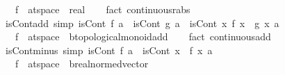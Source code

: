 \begin{isabellebody}
\ \ \ f\ {\isacharcolon}{\kern0pt}{\isacharcolon}{\kern0pt}\ {\isachardoublequoteopen}{\isacharprime}{\kern0pt}a{\isacharcolon}{\kern0pt}{\isacharcolon}{\kern0pt}t{}{\isacharunderscore}{\kern0pt}space\ {\isasymRightarrow}\ real{\isachardoublequoteclose}\isanewline
%
\isadelimproof
\ \ %
\endisadelimproof
%
\isatagproof
{}\isamarkupfalse%
\ {\isacharparenleft}{\kern0pt}fact\ continuous{\isacharunderscore}{\kern0pt}rabs{\isacharparenright}{\kern0pt}%
\endisatagproof
{\isafoldproof}%
%
\isadelimproof
\isanewline
%
\endisadelimproof
\isanewline
{}\isamarkupfalse%
\ isCont{\isacharunderscore}{\kern0pt}add\ {\isacharbrackleft}{\kern0pt}simp{\isacharbrackright}{\kern0pt}{\isacharcolon}{\kern0pt}\ {\isachardoublequoteopen}isCont\ f\ a\ {\isasymLongrightarrow}\ isCont\ g\ a\ {\isasymLongrightarrow}\ isCont\ {\isacharparenleft}{\kern0pt}{\isasymlambda}x{\isachardot}{\kern0pt}\ f\ x\ {\isacharplus}{\kern0pt}\ g\ x{\isacharparenright}{\kern0pt}\ a{\isachardoublequoteclose}\isanewline
\ \ \ f\ {\isacharcolon}{\kern0pt}{\isacharcolon}{\kern0pt}\ {\isachardoublequoteopen}{\isacharprime}{\kern0pt}a{\isacharcolon}{\kern0pt}{\isacharcolon}{\kern0pt}t{}{\isacharunderscore}{\kern0pt}space\ {\isasymRightarrow}\ {\isacharprime}{\kern0pt}b{\isacharcolon}{\kern0pt}{\isacharcolon}{\kern0pt}topological{\isacharunderscore}{\kern0pt}monoid{\isacharunderscore}{\kern0pt}add{\isachardoublequoteclose}\isanewline
%
\isadelimproof
\ \ %
\endisadelimproof
%
\isatagproof
{}\isamarkupfalse%
\ {\isacharparenleft}{\kern0pt}fact\ continuous{\isacharunderscore}{\kern0pt}add{\isacharparenright}{\kern0pt}%
\endisatagproof
{\isafoldproof}%
%
\isadelimproof
\isanewline
%
\endisadelimproof
\isanewline
{}\isamarkupfalse%
\ isCont{\isacharunderscore}{\kern0pt}minus\ {\isacharbrackleft}{\kern0pt}simp{\isacharbrackright}{\kern0pt}{\isacharcolon}{\kern0pt}\ {\isachardoublequoteopen}isCont\ f\ a\ {\isasymLongrightarrow}\ isCont\ {\isacharparenleft}{\kern0pt}{\isasymlambda}x{\isachardot}{\kern0pt}\ {\isacharminus}{\kern0pt}\ f\ x{\isacharparenright}{\kern0pt}\ a{\isachardoublequoteclose}\isanewline
\ \ \ f\ {\isacharcolon}{\kern0pt}{\isacharcolon}{\kern0pt}\ {\isachardoublequoteopen}{\isacharprime}{\kern0pt}a{\isacharcolon}{\kern0pt}{\isacharcolon}{\kern0pt}t{}{\isacharunderscore}{\kern0pt}space\ {\isasymRightarrow}\ {\isacharprime}{\kern0pt}b{\isacharcolon}{\kern0pt}{\isacharcolon}{\kern0pt}real{\isacharunderscore}{\kern0pt}normed{\isacharunderscore}{\kern0pt}vector{\isachardoublequoteclose}\isanewline

\end{isabellebody}

